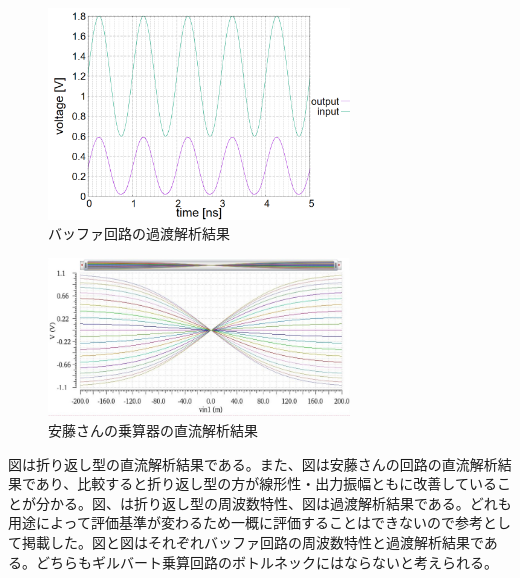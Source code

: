 \documentclass[twocolumn]{jsarticle}
\begin{document}
    \begin{figure}[H]
        \begin{center}
            \includegraphics*[width = 80mm]{figures/buf_tr.PNG}
            \caption{バッファ回路の過渡解析結果}
            \label{fig:sim_buf_tr}
        \end{center}
    \end{figure}
    \begin{figure}[H]
        \begin{center}
            \includegraphics*[width = 80mm]{figures/for_compair_dc.png}
            \caption{安藤さんの乗算器の直流解析結果}
            \label{fig:sim_for_compair}
        \end{center}
    \end{figure}
    図は折り返し型の直流解析結果である。また、図は安藤さんの回路の直流解析結果であり、比較すると折り返し型の方が線形性・出力振幅ともに改善していることが分かる。図、は折り返し型の周波数特性、図は過渡解析結果である。どれも用途によって評価基準が変わるため一概に評価することはできないので参考として掲載した。図と図はそれぞれバッファ回路の周波数特性と過渡解析結果である。どちらもギルバート乗算回路のボトルネックにはならないと考えられる。
\end{document}
